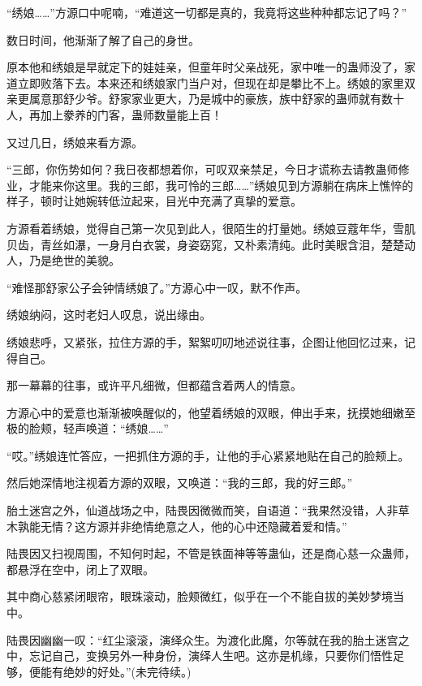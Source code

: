 \begin{this_body}
“绣娘……”方源口中呢喃，“难道这一切都是真的，我竟将这些种种都忘记了吗？”

数日时间，他渐渐了解了自己的身世。

原本他和绣娘是早就定下的娃娃亲，但童年时父亲战死，家中唯一的蛊师没了，家道立即败落下去。本来还和绣娘家门当户对，但现在却是攀比不上。绣娘的家里双亲更属意那舒少爷。舒家家业更大，乃是城中的豪族，族中舒家的蛊师就有数十人，再加上豢养的门客，蛊师数量能上百！

又过几日，绣娘来看方源。

“三郎，你伤势如何？我日夜都想着你，可叹双亲禁足，今日才谎称去请教蛊师修业，才能来你这里。我的三郎，我可怜的三郎……”绣娘见到方源躺在病床上憔悴的样子，顿时让她婉转低泣起来，目光中充满了真挚的爱意。

方源看着绣娘，觉得自己第一次见到此人，很陌生的打量她。绣娘豆蔻年华，雪肌贝齿，青丝如瀑，一身月白衣裳，身姿窈窕，又朴素清纯。此时美眼含泪，楚楚动人，乃是绝世的美貌。

“难怪那舒家公子会钟情绣娘了。”方源心中一叹，默不作声。

绣娘纳闷，这时老妇人叹息，说出缘由。

绣娘悲呼，又紧张，拉住方源的手，絮絮叨叨地述说往事，企图让他回忆过来，记得自己。

那一幕幕的往事，或许平凡细微，但都蕴含着两人的情意。

方源心中的爱意也渐渐被唤醒似的，他望着绣娘的双眼，伸出手来，抚摸她细嫩至极的脸颊，轻声唤道：“绣娘……”

“哎。”绣娘连忙答应，一把抓住方源的手，让他的手心紧紧地贴在自己的脸颊上。

然后她深情地注视着方源的双眼，又唤道：“我的三郎，我的好三郎。”

胎土迷宫之外，仙道战场之中，陆畏因微微而笑，自语道：“我果然没错，人非草木孰能无情？这方源并非绝情绝意之人，他的心中还隐藏着爱和情。”

陆畏因又扫视周围，不知何时起，不管是铁面神等等蛊仙，还是商心慈一众蛊师，都悬浮在空中，闭上了双眼。

其中商心慈紧闭眼帘，眼珠滚动，脸颊微红，似乎在一个不能自拔的美妙梦境当中。

陆畏因幽幽一叹：“红尘滚滚，演绎众生。为渡化此魔，尔等就在我的胎土迷宫之中，忘记自己，变换另外一种身份，演绎人生吧。这亦是机缘，只要你们悟性足够，便能有绝妙的好处。”(未完待续。)

\end{this_body}

